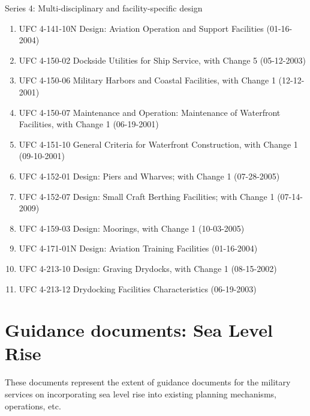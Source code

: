\documentclass[10pt]{amsart}
\begin{document}
Series 4: Multi-disciplinary and facility-specific design
\begin{enumerate}
\item UFC 4-141-10N Design: Aviation Operation and Support Facilities (01-16-2004)
\item UFC 4-150-02 Dockside Utilities for Ship Service, with Change 5 (05-12-2003)
\item UFC 4-150-06 Military Harbors and Coastal Facilities, with Change 1 (12-12-2001)
\item UFC 4-150-07 Maintenance and Operation: Maintenance of Waterfront Facilities, with Change 1 (06-19-2001)
\item UFC 4-151-10 General Criteria for Waterfront Construction, with Change 1 (09-10-2001) 	
\item UFC 4-152-01 Design: Piers and Wharves; with Change 1 (07-28-2005)
\item UFC 4-152-07 Design: Small Craft Berthing Facilities; with Change 1 (07-14-2009)
\item UFC 4-159-03 Design: Moorings, with Change 1 (10-03-2005)
\item UFC 4-171-01N Design: Aviation Training Facilities (01-16-2004)
\item UFC 4-213-10 Design: Graving Drydocks, with Change 1 (08-15-2002)
\item UFC 4-213-12 Drydocking Facilities Characteristics (06-19-2003)
\end{enumerate}

\section{Guidance documents: Sea Level Rise}
These documents represent the extent of guidance documents for the military services on incorporating sea level rise into existing planning mechanisms, operations, etc.
\end{document}
